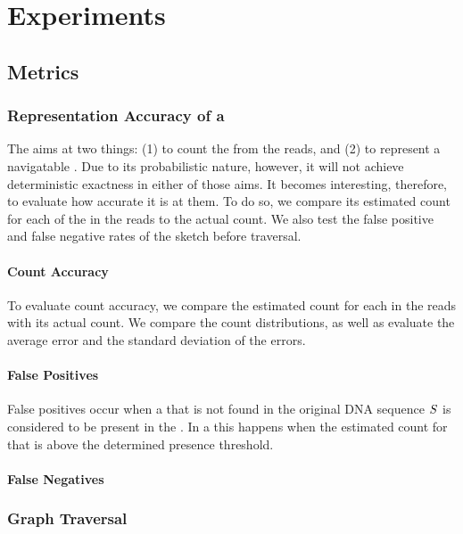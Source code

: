 \section{Experiments}

\subsection{Metrics}


\subsubsection{Representation Accuracy of a \dBCM}

The \dBCM aims at two things: (1) to count the  from the reads, and (2) to represent a navigatable \dBG. Due to its probabilistic nature, however, it will not achieve deterministic exactness in either of those aims. It becomes interesting, therefore, to evaluate how accurate it is at them. To do so, we compare its estimated count for each of the  in the reads to the  actual count. We also test the false positive and false negative rates of the sketch before traversal.

\paragraph{Count Accuracy} To evaluate count accuracy, we compare the estimated count for each \kmer in the reads with its actual count. We compare the count distributions, as well as evaluate  the average error and the standard deviation of the errors.

\paragraph{False Positives} False positives occur when a \kmer that is not found in the original DNA sequence $\strname{S}$ is considered to be present in the \dBG. In a \dBCM this happens when the estimated count for that \kmer is above the determined presence threshold.

\paragraph{False Negatives}

\subsubsection{Graph Traversal}

